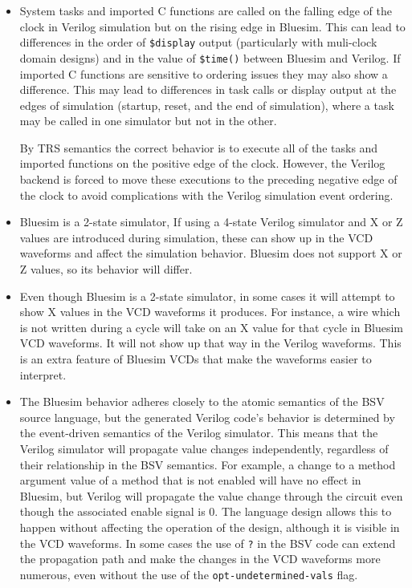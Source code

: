 \documentclass{article}
\newcommand{\te}[1]{\texttt{#1}}
\begin{document}
\begin{itemize}


\item System tasks and imported C functions are called on the falling
edge of the clock in Verilog simulation but on the rising edge in
Bluesim.  This can lead to differences in the order of \te{\$display}
output (particularly with muli-clock domain designs) and in the value
of \te{\$time()} between Bluesim and Verilog.  If imported C functions
are sensitive to ordering issues they may also show a difference.
This may lead to differences in task calls or display output at the
edges of simulation (startup, reset, and the end of simulation), where
a task may be called in one simulator but not in the other.

By TRS semantics the correct behavior is to execute all of the tasks
and imported functions on the positive edge of the clock.  However, the
Verilog backend is forced to move these executions to the preceding
negative edge of the clock to avoid complications with the Verilog
simulation event ordering.


\item Bluesim is a 2-state simulator,  If using a 4-state Verilog
simulator and X or Z values are introduced during simulation, these can
show up in the VCD waveforms and affect the simulation behavior.
Bluesim does not support X or Z values, so its behavior will differ.


\item Even though Bluesim is a 2-state simulator, in some cases it
will attempt to show X values in the VCD waveforms it produces.  For
instance, a wire which is not written during a cycle will take on an X
value for that cycle in Bluesim VCD waveforms.  It will not show up
that way in the Verilog waveforms.  This is an extra feature of
Bluesim VCDs that make the waveforms easier to interpret.




\item The Bluesim behavior adheres closely to the atomic semantics of the BSV
source language, but the generated Verilog code's behavior is
determined by the event-driven semantics of the Verilog simulator.
This means that the Verilog simulator will propagate value changes
independently, regardless of their relationship in the BSV semantics.
For example, a change to a method argument value of a method that is
not enabled will have no effect in Bluesim, but Verilog will propagate
the value change through the circuit even though the associated enable
signal is 0.  The language design allows this to happen without
affecting the operation of the design, although it is visible in the
VCD waveforms.  In some cases the use of \te{?} in the BSV code can extend
the propagation path and make the changes in the VCD waveforms more
numerous, even without the use of the \te{opt-undetermined-vals} flag.


\end{itemize}
\end{document}
